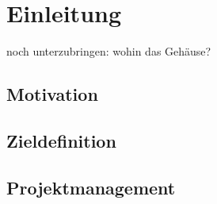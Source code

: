 
\chapter{Einleitung}
\label{sec:Einleitung}
\pagestyle{scrheadings}



noch unterzubringen:
wohin das Gehäuse?
\section{Motivation}

\section{Zieldefinition}

\section{Projektmanagement}
